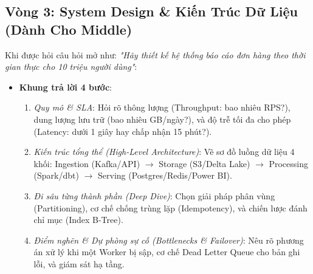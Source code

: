 \subsection{Vòng 3: System Design \& Kiến Trúc Dữ Liệu (Dành Cho Middle)}
Khi được hỏi câu hỏi mở như: \textit{"Hãy thiết kế hệ thống báo cáo đơn hàng theo thời gian thực cho 10 triệu người dùng"}:
\begin{itemize}
    \item \textbf{Khung trả lời 4 bước}:
    \begin{enumerate}
        \item \textit{Quy mô \& SLA}: Hỏi rõ thông lượng (Throughput: bao nhiêu RPS?), dung lượng lưu trữ (bao nhiêu GB/ngày?), và độ trễ tối đa cho phép (Latency: dưới 1 giây hay chấp nhận 15 phút?).
        \item \textit{Kiến trúc tổng thể (High-Level Architecture)}: Vẽ sơ đồ luồng dữ liệu 4 khối: Ingestion (Kafka/API) $\rightarrow$ Storage (S3/Delta Lake) $\rightarrow$ Processing (Spark/dbt) $\rightarrow$ Serving (Postgres/Redis/Power BI).
        \item \textit{Đi sâu từng thành phần (Deep Dive)}: Chọn giải pháp phân vùng (Partitioning), cơ chế chống trùng lặp (Idempotency), và chiến lược đánh chỉ mục (Index B-Tree).
        \item \textit{Điểm nghẽn \& Dự phòng sự cố (Bottlenecks \& Failover)}: Nêu rõ phương án xử lý khi một Worker bị sập, cơ chế Dead Letter Queue cho bản ghi lỗi, và giám sát hạ tầng.
    \end{enumerate}
\end{itemize}

